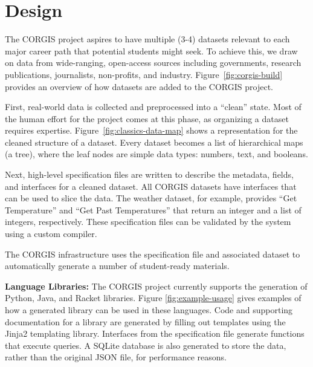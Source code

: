 \documentclass{sig-alternate}
\begin{document}
\section{Design}

The CORGIS project aspires to have multiple (3-4) data\-sets relevant to each major career path that potential students might seek.
To achieve this, we draw on data from wide-ranging, open-access sources including governments, research publications, journalists, non-profits, and industry.
Figure~\ref{fig:corgis-build} provides an overview of how datasets are added to the CORGIS project. 

First, real-world data is collected and preprocessed into a ``clean'' state.
Most of the human effort for the project comes at this phase, as organizing a dataset requires expertise.
Figure~\ref{fig:classics-data-map} shows a representation for the cleaned structure of a dataset.
Every dataset becomes a list of hierarchical maps (a tree), where the leaf nodes are simple data types: numbers, text, and booleans.

Next, high-level specification files are written to describe the metadata, fields, and interfaces for a cleaned dataset.
All CORGIS datasets have interfaces that can be used to slice the data.
The weather dataset, for example, provides ``Get Temperature'' and ``Get Past Temperatures'' that return an integer and a list of integers, respectively.
These specification files can be validated by the system using a custom compiler.

The CORGIS infrastructure uses the specification file and associated dataset to automatically generate a number of student-ready materials.

\textbf{Language Libraries: } The CORGIS project currently supports the generation of Python, Java, and Racket libraries.
Figure \ref{fig:example-usage} gives examples of how a generated library can be used in these languages.
Code and supporting documentation for a library are generated by filling out templates using the Jinja2 templating library.
Interfaces from the specification file generate functions that execute queries.
A SQLite database is also generated to store the data, rather than the original JSON file, for performance reasons.
\end{document}
